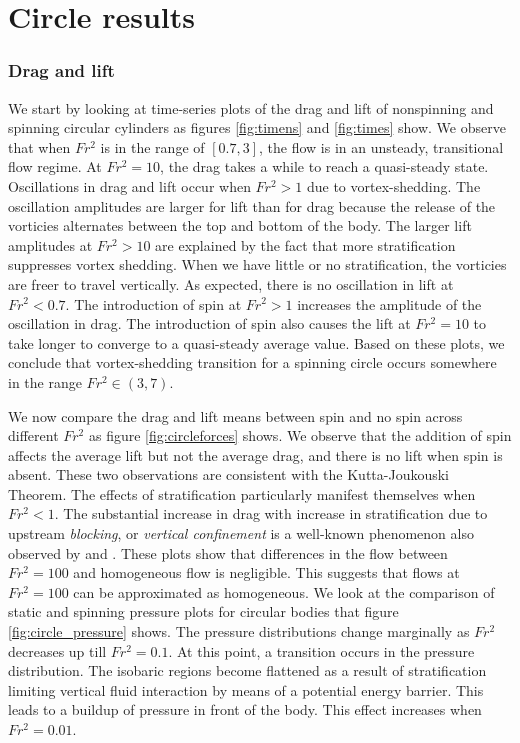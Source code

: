 \section{Circle results}
\label{section:Circle_results}
\subsubsection{Drag and lift}
We start by looking at time-series plots of the drag and lift of nonspinning and spinning circular cylinders as figures \ref{fig:timens} and \ref{fig:times} show. We observe that when $Fr^2$ is in the range of $[0.7, 3]$, the flow is in an unsteady, transitional flow regime. At $Fr^2 = 10$, the drag takes a while to reach a quasi-steady state. Oscillations in drag and lift occur when $Fr^2 > 1$ due to vortex-shedding. The oscillation amplitudes are larger for lift than for drag because the release of the vorticies alternates between the top and bottom of the body. The larger lift amplitudes at $Fr^2 > 10$ are explained by the fact that more stratification suppresses vortex shedding. When we have little or no stratification, the vorticies are freer to travel vertically. As expected, there is no oscillation in lift at $Fr^2 < 0.7$. The introduction of spin at $Fr^2 > 1$ increases the amplitude of the oscillation in drag. The introduction of spin also causes the lift at $Fr^2 = 10$ to take longer to converge to a quasi-steady average value. Based on these plots, we conclude that vortex-shedding transition for a spinning circle occurs somewhere in the range $Fr^2 \in (3,7)$. 

We now compare the drag and lift means between spin and no spin across different $Fr^2$ as figure \ref{fig:circleforces} shows. We observe that the addition of spin affects the average lift but not the average drag, and there is no lift when spin is absent. These two observations are consistent with the Kutta-Joukouski Theorem. The effects of stratification particularly manifest themselves when $Fr^2 < 1$. The substantial increase in drag with increase in stratification due to upstream \textit{blocking}, or \textit{vertical confinement} is a well-known phenomenon also observed by \cite{deng_drag_2022} and \cite{ortiz-tarin_stratified_2019}. These plots show that differences in the flow between $Fr^2 = 100$ and homogeneous flow is negligible. This suggests that flows at $Fr^2 = 100$ can be approximated as homogeneous. We look at the comparison of static and spinning pressure plots for circular bodies that figure \ref{fig:circle_pressure} shows. The pressure distributions change marginally as $Fr^2$ decreases up till $Fr^2 = 0.1$. At this point, a transition occurs in the pressure distribution. The isobaric regions become flattened as a result of stratification limiting vertical fluid interaction by means of a potential energy barrier. This leads to a buildup of pressure in front of the body. This effect increases when $Fr^2 = 0.01$. 

